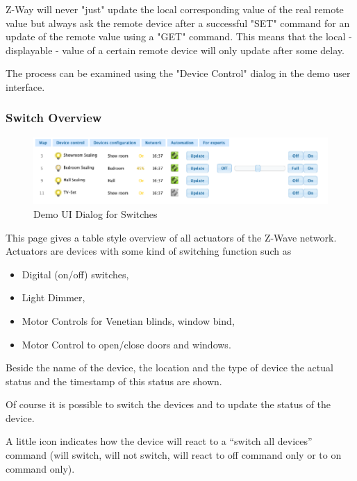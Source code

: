 Z-Way will never "just" update the local corresponding value of the real remote value but always ask the remote device after a successful "SET"  command for 
an update of the remote value using a "GET" command.  This means that the local  - displayable - value of a certain remote device will only update after some delay.

The process can be examined using the "Device Control" dialog in the demo user interface.

 
\subsubsection{Switch Overview}



\begin{figure} 
\begin{center}
\includegraphics[scale=0.8]{pics/switches.png}
\caption{Demo UI Dialog for Switches}
\label{c3:demosen} 
\end{center}
 \end{figure}
This page gives a table style overview of all actuators of the Z-Wave network. Actuators are devices with some kind of switching function such as 

\begin{itemize}
\item Digital (on/off) switches, 
\item Light Dimmer, 
\item Motor Controls for Venetian blinds, window bind,
\item Motor Control to open/close doors and windows.
\end{itemize}

Beside the name of the device, the location and the type of device the actual status and the timestamp of this status are shown.

Of course it is possible to switch the devices and to update the status of the device.

A little icon indicates how the device will react to a “switch all devices” command  (will switch, will 
not switch, will react to off command only or to on command only).

